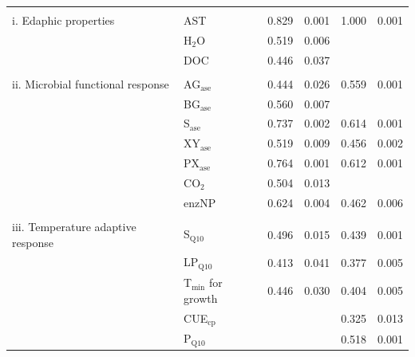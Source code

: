 \documentclass[
  letterpaper,
  DIV=11,
  numbers=noendperiod]{scrartcl}
\begin{document}
\begin{table}[H]
\begin{tabular}[t]{>{\raggedright\arraybackslash}p{24em}lcccc}
\midrule
\addlinespace[-0.7em]
\multicolumn{6}{l}{\textbf{}}\\
\hspace{1em}i. Edaphic properties & AST & 0.829 & 0.001 & 1.000 & 0.001\\
\hspace{1em} & H$_{2}$O & 0.519 & 0.006 &  & \\
\hspace{1em} & DOC & 0.446 & 0.037 &  & \\
\midrule
\addlinespace[-0.7em]
\multicolumn{6}{l}{\textbf{}}\\
\hspace{1em}ii. Microbial functional response & AG$_{\mathrm{ase}}$ & 0.444 & 0.026 & 0.559 & 0.001\\
\hspace{1em} & BG$_{\mathrm{ase}}$ & 0.560 & 0.007 &  & \\
\hspace{1em} & S$_{\mathrm{ase}}$ & 0.737 & 0.002 & 0.614 & 0.001\\
\hspace{1em} & XY$_{\mathrm{ase}}$ & 0.519 & 0.009 & 0.456 & 0.002\\
\hspace{1em} & PX$_{\mathrm{ase}}$ & 0.764 & 0.001 & 0.612 & 0.001\\
\hspace{1em} & CO$_{2}$ & 0.504 & 0.013 &  & \\
\hspace{1em} & enzNP & 0.624 & 0.004 & 0.462 & 0.006\\
\midrule
\addlinespace[-0.7em]
\multicolumn{6}{l}{\textbf{}}\\
\hspace{1em}iii. Temperature adaptive response & S$_{\mathrm{Q10}}$ & 0.496 & 0.015 & 0.439 & 0.001\\
\hspace{1em} & LP$_{\mathrm{Q10}}$ & 0.413 & 0.041 & 0.377 & 0.005\\
\hspace{1em} & T$_{\mathrm{min}}$ for growth & 0.446 & 0.030 & 0.404 & 0.005\\
\hspace{1em} & CUE$_{\mathrm{cp}}$ &  &  & 0.325 & 0.013\\
\hspace{1em} & P$_{\mathrm{Q10}}$ &  &  & 0.518 & 0.001\\
\midrule

\end{tabular}
\end{table}
\end{document}
